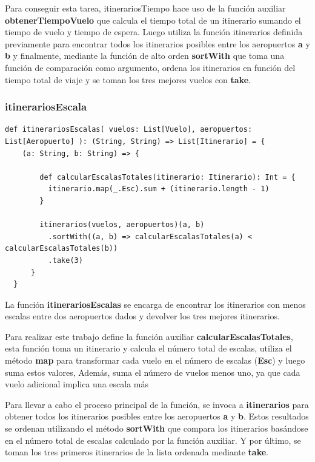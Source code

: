 \documentclass[letterpaper]{article}
\begin{document}
Para conseguir esta tarea, itinerariosTiempo hace uso de la función auxiliar \textbf{obtenerTiempoVuelo} que calcula el tiempo total de un itinerario sumando el tiempo de vuelo y tiempo de espera. Luego utiliza la función itinerarios definida previamente para encontrar todos los itinerarios posibles entre los aeropuertos \textbf{a} y \textbf{b} y finalmente, mediante la función de alto orden \textbf{sortWith} que toma una función de comparación como argumento, ordena los itinerarios en función del tiempo total de viaje y se toman los tres mejores vuelos con \textbf{take}.

\subsubsection{itinerariosEscala}
\begin{lstlisting}[caption={Función para minimizar el numero de escalas totales}, label={lst:itinerariosEscalas}, captionpos=b]
  def itinerariosEscalas( vuelos: List[Vuelo], aeropuertos: List[Aeropuerto] ): (String, String) => List[Itinerario] = {
    (a: String, b: String) => {

        def calcularEscalasTotales(itinerario: Itinerario): Int = {
          itinerario.map(_.Esc).sum + (itinerario.length - 1)
        }

        itinerarios(vuelos, aeropuertos)(a, b)
          .sortWith((a, b) => calcularEscalasTotales(a) < calcularEscalasTotales(b))
          .take(3)
      }
  }

\end{lstlisting}

La función \textbf{itinerariosEscalas} se encarga de encontrar los itinerarios con menos escalas entre dos aeropuertos dados y devolver los tres mejores itinerarios.

Para realizar este trabajo define la función auxiliar \textbf{calcularEscalasTotales}, esta función toma un itinerario y calcula el número total de escalas, utiliza el método \textbf{map} para transformar cada vuelo en el número de escalas (\textbf{Esc}) y luego suma estos valores, Además, suma el número de vuelos menos uno, ya que cada vuelo adicional implica una escala más

Para llevar a cabo el proceso principal de la función, se invoca a \textbf{itinerarios} para obtener todos los itinerarios posibles entre los aeropuertos \textbf{a} y \textbf{b}. Estos resultados se ordenan utilizando el método \textbf{sortWith} que compara los itinerarios basándose en el número total de escalas calculado por la función auxiliar. Y por último, se toman los tres primeros itinerarios de la lista ordenada mediante \textbf{take}.
\end{document}
